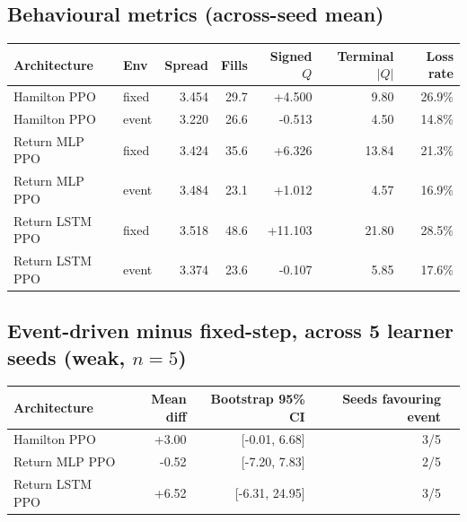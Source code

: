 \subsection*{Behavioural metrics (across-seed mean)}
\begin{table}[h]
\centering
\begin{tabular}{llrrrrr}
\hline
Architecture & Env & Spread & Fills & Signed $Q$ & Terminal $|Q|$ & Loss rate \\
\hline
Hamilton PPO    & fixed & 3.454 & 29.7 & +4.500 & 9.80  & 26.9\% \\
Hamilton PPO    & event & 3.220 & 26.6 & -0.513 & 4.50  & 14.8\% \\
Return MLP PPO  & fixed & 3.424 & 35.6 & +6.326 & 13.84 & 21.3\% \\
Return MLP PPO  & event & 3.484 & 23.1 & +1.012 & 4.57  & 16.9\% \\
Return LSTM PPO & fixed & 3.518 & 48.6 & +11.103 & 21.80 & 28.5\% \\
Return LSTM PPO & event & 3.374 & 23.6 & -0.107 & 5.85  & 17.6\% \\
\hline
\end{tabular}
\end{table}

\subsection*{Event-driven minus fixed-step, across 5 learner seeds (weak, $n=5$)}
\begin{table}[h]
\centering
\begin{tabular}{lrrrr}
\hline
Architecture & Mean diff & Bootstrap 95\% CI & Seeds favouring event \\
\hline
Hamilton PPO    & +3.00 & [-0.01, 6.68]  & 3/5 \\
Return MLP PPO  & -0.52 & [-7.20, 7.83]  & 2/5 \\
Return LSTM PPO & +6.52 & [-6.31, 24.95] & 3/5 \\
\hline
\end{tabular}
\end{table}
